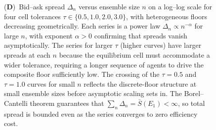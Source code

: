 \begin{figure}[!htbp]
{    (\textbf{D})~Bid--ask spread $\Delta_n$ versus ensemble size $n$ on a log--log scale for four cell tolerances $\tau \in \{0.5, 1.0, 2.0, 3.0\}$, with heterogeneous floors decreasing geometrically.  Each series is a power law $\Delta_n \propto n^{-\alpha}$ for large $n$, with exponent $\alpha > 0$ confirming that spreads vanish asymptotically.  The series for larger $\tau$ (higher curves) have larger spreads at each $n$ because the equilibrium cell must accommodate a wider tolerance, requiring a longer sequence of agents to drive the composite floor sufficiently low.  The crossing of the $\tau = 0.5$ and $\tau = 1.0$ curves for small $n$ reflects the discrete-floor structure at small ensemble sizes before asymptotic scaling sets in.  The Borel--Cantelli theorem guarantees that $\sum_n \Delta_n = \bar{S}(E_1) < \infty$, so total spread is bounded even as the series converges to zero efficiency cost.}
    \label{fig:market_panel_5}
\end{figure}
